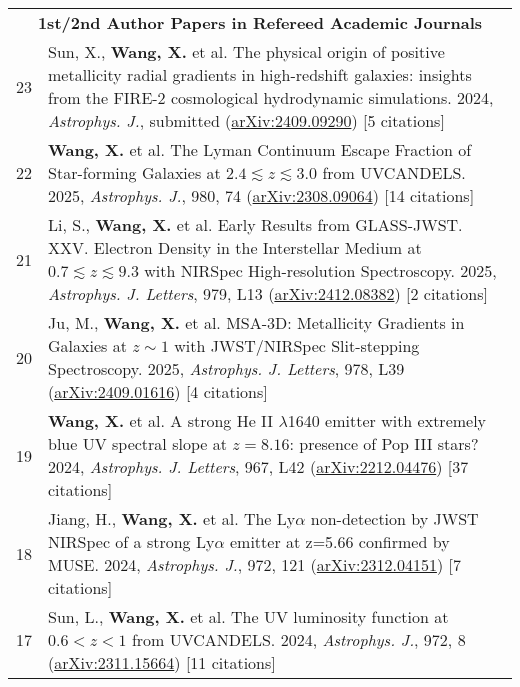 \documentclass[letterpaper,10pt]{article}
\begin{document}
\begingroup
\renewcommand\arraystretch{1.2}
\vspace*{-.5em}
\begin{longtable}{rp{6.3in}}

\multicolumn{2}{c}{\textbf{1st/2nd Author Papers in Refereed Academic Journals}}      \\

    23 & Sun, X., \textbf{Wang, X.} et al. The physical origin of positive metallicity radial gradients in high-redshift galaxies: insights from the FIRE-2 cosmological hydrodynamic simulations. 2024, \textit{Astrophys. J.}, submitted (\href{https://arxiv.org/abs/2409.09290}{arXiv:2409.09290}) [5 citations] \\

    22 & \textbf{Wang, X.} et al. The Lyman Continuum Escape Fraction of Star-forming Galaxies at $2.4\lesssim z\lesssim3.0$ from UVCANDELS. 2025, \textit{Astrophys. J.}, 980, 74 (\href{https://arxiv.org/abs/2308.09064}{arXiv:2308.09064}) [14 citations] \\

    21 & Li, S., \textbf{Wang, X.} et al. Early Results from GLASS-JWST. XXV. Electron Density in the Interstellar Medium at $0.7\lesssim z\lesssim9.3$ with NIRSpec High-resolution Spectroscopy. 2025, \textit{Astrophys. J. Letters}, 979, L13 (\href{https://arxiv.org/abs/2412.08382}{arXiv:2412.08382}) [2 citations] \\

    20 & Ju, M., \textbf{Wang, X.} et al. MSA-3D: Metallicity Gradients in Galaxies at $z\sim1$ with JWST/NIRSpec Slit-stepping Spectroscopy. 2025, \textit{Astrophys. J. Letters}, 978, L39 (\href{https://arxiv.org/abs/2409.01616}{arXiv:2409.01616}) [4 citations] \\

    19 &  \textbf{Wang, X.} et al. A strong He II $\lambda$1640 emitter with extremely blue UV spectral slope at $z=8.16$: presence of Pop III stars? 2024, \textit{Astrophys. J. Letters}, 967, L42 (\href{https://arxiv.org/abs/2212.04476}{arXiv:2212.04476}) [37 citations]  \\

    18 & Jiang, H., \textbf{Wang, X.} et al. The Ly$\alpha$ non-detection by JWST NIRSpec of a strong Ly$\alpha$ emitter at z=5.66 confirmed by MUSE. 2024, \textit{Astrophys. J.}, 972, 121 (\href{https://arxiv.org/abs/2312.04151}{arXiv:2312.04151}) [7 citations] \\

    17 & Sun, L., \textbf{Wang, X.} et al. The UV luminosity function at $0.6 < z < 1$ from UVCANDELS. 2024, \textit{Astrophys. J.}, 972, 8 (\href{https://arxiv.org/abs/2311.15664}{arXiv:2311.15664}) [11 citations] \\


\end{longtable}
\end{document}
